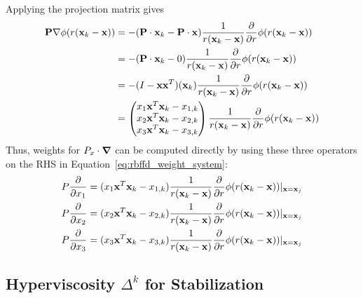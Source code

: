 \documentclass[11pt]{report}
\begin{document}
{Applying the projection matrix gives 
\begin{align*}
\mathbf{P} \nabla \phi(r(\mathbf{x}_k - \mathbf{x})) & = - (\mathbf{P} \cdot \mathbf{x}_k - \mathbf{P}\cdot\mathbf{x})\frac{1}{r(\mathbf{x}_k - \mathbf{x})}  \frac{\partial }{\partial r} \phi(r(\mathbf{x}_k - \mathbf{x})) \\
& =  - (\mathbf{P}\cdot\mathbf{x}_k - 0)\frac{1}{r(\mathbf{x}_k - \mathbf{x})}  \frac{\partial }{\partial r} \phi(r(\mathbf{x}_k - \mathbf{x})) \\
& = - (I-\mathbf{x}\mathbf{x}^T)(\mathbf{x}_k
)\frac{1}{r(\mathbf{x}_k - \mathbf{x})}  \frac{\partial }{\partial r} \phi(r(\mathbf{x}_k - \mathbf{x})) \\
& = \begin{pmatrix} x_1 \mathbf{x}^T \mathbf{x}_k - x_{1,k} \\ x_2 \mathbf{x}^T \mathbf{x}_k -  x_{2,k} \\ x_3 \mathbf{x}^T \mathbf{x}_k -x_{3,k} \end{pmatrix} \frac{1}{r(\mathbf{x}_k - \mathbf{x})}  \frac{\partial }{\partial r} \phi(r(\mathbf{x}_k - \mathbf{x})) 
 \end{align*}
Thus, weights for $P_{x}\cdot\mbox{\boldmath$ \nabla $}$ can be computed directly by using these three operators on the RHS in Equation~\ref{eq:rbffd_weight_system}: 
\begin{align*} 
P\frac{\partial }{\partial x_1} = ( x_1 \mathbf{x}^T \mathbf{x}_k - x_{1,k}) \frac{1}{r(\mathbf{x}_k - \mathbf{x})}  \frac{\partial }{\partial r} \phi(r(\mathbf{x}_k - \mathbf{x})) |_{\mathbf{x}=\mathbf{x}_j} \\
P\frac{\partial }{\partial x_2} = ( x_2 \mathbf{x}^T \mathbf{x}_k - x_{2,k}) \frac{1}{r(\mathbf{x}_k - \mathbf{x})}  \frac{\partial }{\partial r} \phi(r(\mathbf{x}_k - \mathbf{x})) |_{\mathbf{x}=\mathbf{x}_j} \\
P\frac{\partial }{\partial x_3} = ( x_3 \mathbf{x}^T \mathbf{x}_k - x_{3,k}) \frac{1}{r(\mathbf{x}_k - \mathbf{x})}  \frac{\partial }{\partial r} \phi(r(\mathbf{x}_k - \mathbf{x})) |_{\mathbf{x}=\mathbf{x}_j}
\end{align*}




\subsection{Hyperviscosity $\Delta^k$ for Stabilization}
\label{sec:hyperviscosity_operators}

}
\end{document}
